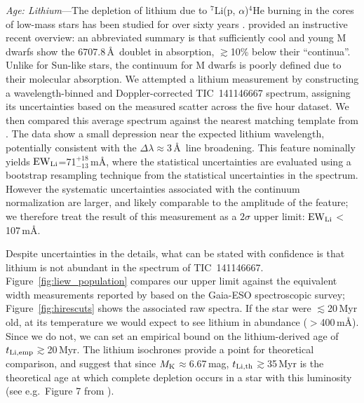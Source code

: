 \documentclass{nature3}
\begin{document}
\begin{methods}
{\it Age: Lithium}---The depletion of lithium due to $^7$Li(p,
$\alpha$)$^4$He burning in the cores of low-mass stars has been studied
for over sixty years \cite{Hayashi1963,Bildsten1997,Burke2004}.
\cite{Wood2023} provided an instructive recent overview: an abbreviated
summary is that sufficiently cool and young M dwarfs show the 6707.8\,\AA\
doublet in absorption, $\gtrsim$10\% below their ``continua''.  Unlike
for Sun-like stars, the continuum for M dwarfs is poorly defined due to
their molecular absorption.  We attempted a lithium measurement by
constructing a wavelength-binned and Doppler-corrected TIC~141146667
spectrum, assigning its uncertainties based on the measured scatter
across the five hour dataset.  We then compared this average spectrum
against the nearest matching template from \cite{Bochanski2007}.  The
data show a small depression near the expected lithium wavelength,
potentially consistent with the $\Delta \lambda$$\approx$3\,\AA\ line
broadening.  This feature nominally yields ${\rm EW}_{\rm
Li}$=71$^{+18}_{-13}$\,m\AA, where the statistical uncertainties are
evaluated using a bootstrap resampling technique from the statistical
uncertainties in the spectrum.  However the systematic uncertainties associated
with the continuum normalization are larger, and likely comparable to
the amplitude of the feature; we therefore treat the result of this
measurement as a $2\sigma$ upper limit: ${\rm EW}_{\rm Li}$$<$107\,m\AA.

Despite uncertainties in the details, what can be stated with confidence
is that lithium is not abundant in the spectrum of TIC~141146667.
Figure~\ref{fig:liew_population} compares our upper limit against the
equivalent width measurements reported by \cite{Jeffries2023}
based on the Gaia-ESO spectroscopic survey; Figure~\ref{fig:hirescuts}
shows the associated raw spectra.  If the star were $\lesssim$20\,Myr
old, at its temperature we would expect to see lithium in abundance
($>$400\,m\AA).  Since we do not, we can set an empirical bound on the
lithium-derived age of $t_{\rm Li,emp}$$\gtrsim$20\,Myr.  The
\cite{Feiden2016} lithium isochrones provide a point for theoretical
comparison, and suggest that since $M_{\rm K}$$\approx$6.67\,mag,
$t_{\rm Li,th}$$\gtrsim$35\,Myr is the theoretical age at which
complete depletion occurs in a star with this luminosity (see
e.g.~Figure 7 from \cite{Wood2023}).




\end{methods}
\end{document}
